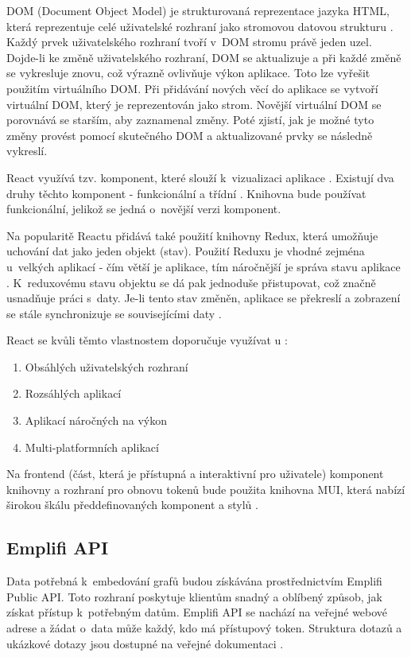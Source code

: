 \documentclass[czech, bc, kiv, he, iso690numb, viewonly]{fasthesis} %
\begin{document}
DOM (Document Object Model) je strukturovaná reprezentace jazyka HTML, která reprezentuje celé uživatelské rozhraní jako stromovou datovou strukturu \cite{whatIsDOM}. Každý prvek uživatelského
rozhraní tvoří v~DOM stromu právě jeden uzel. Dojde-li ke změně uživatelského rozhraní, DOM se aktualizuje 	a při každé změně se vykresluje znovu, což výrazně ovlivňuje výkon aplikace. 
Toto lze vyřešit použitím virtuálního DOM. Při přidávání nových věcí do aplikace se vytvoří virtuální DOM, který je reprezentován jako strom. Novější virtuální DOM se porovnává se starším, aby
zaznamenal změny. Poté zjistí, jak je možné tyto změny provést pomocí skutečného DOM a aktualizované prvky se následně vykreslí.

React využívá tzv. komponent, které slouží k~vizualizaci aplikace \cite{introToReact}. Existují dva druhy těchto komponent - funkcionální a třídní \cite{functionalVsClass}. Knihovna bude používat funkcionální, jelikož
se jedná o~novější verzi komponent.

Na popularitě Reactu přidává také použití knihovny Redux, která umožňuje uchování dat jako jeden objekt (stav). Použití Reduxu je vhodné zejména u~velkých aplikací - čím větší je aplikace, tím
náročnější je správa stavu aplikace \cite{introToRedux}. K~reduxovému stavu objektu se dá pak jednoduše přistupovat, což značně usnadňuje práci s~daty.
Je-li tento stav změněn, aplikace se překreslí a zobrazení se stále synchronizuje se souvisejícími daty \cite{whyUsingReact2}. 

React se kvůli těmto vlastnostem doporučuje využívat u \cite{whyUsingReact2}:
\begin{enumerate}
\item Obsáhlých uživatelských rozhraní
\item Rozsáhlých aplikací
\item Aplikací náročných na výkon
\item Multi-platformních aplikací
\end{enumerate}

Na frontend (část, která je přístupná a interaktivní pro uživatele) komponent knihovny a rozhraní pro obnovu tokenů bude použita knihovna MUI, která nabízí širokou škálu předdefinovaných komponent a stylů \cite{muiDocs}. 	

\subsection{Emplifi API}	
Data potřebná k~embedování grafů budou získávána prostřednictvím Emplifi Public API. 
Toto rozhraní poskytuje klientům snadný a oblíbený způsob, jak získat přístup k~potřebným datům. 
Emplifi API se nachází na veřejné webové adrese a žádat o~data může každý, kdo má přístupový token.
Struktura dotazů a ukázkové dotazy jsou dostupné na veřejné dokumentaci \cite{emplifiDocs}.
\end{document}
